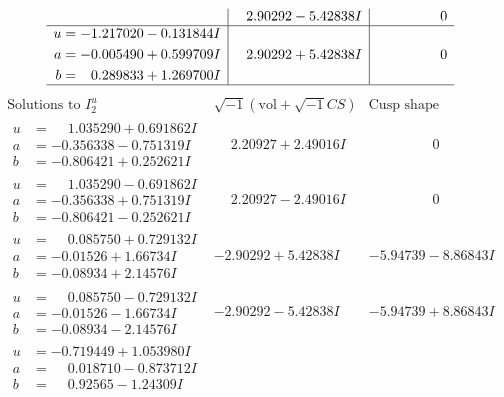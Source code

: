 \documentclass[1p]{elsarticle_modified}
\theoremstyle{definition}
\newcommand{\I}{\sqrt{-1}}
\begin{document}
$$\begin{array}{c|c|c}
 & \phantom{-}2.90292 - 5.42838 I & \phantom{-0.000000 } 0 \\ \hline\begin{aligned}
u &= -1.217020 - 0.131844 I \\
a &= -0.005490 + 0.599709 I \\
b &= \phantom{-}0.289833 + 1.269700 I\end{aligned}
 & \phantom{-}2.90292 + 5.42838 I & \phantom{-0.000000 } 0\\
 \hline 
 \end{array}$$\newpage$$\begin{array}{c|c|c}  
\text{Solutions to }I^u_{2}& \I (\text{vol} + \sqrt{-1}CS) & \text{Cusp shape}\\
 \hline 
\begin{aligned}
u &= \phantom{-}1.035290 + 0.691862 I \\
a &= -0.356338 - 0.751319 I \\
b &= -0.806421 + 0.252621 I\end{aligned}
 & \phantom{-}2.20927 + 2.49016 I & \phantom{-0.000000 } 0 \\ \hline\begin{aligned}
u &= \phantom{-}1.035290 - 0.691862 I \\
a &= -0.356338 + 0.751319 I \\
b &= -0.806421 - 0.252621 I\end{aligned}
 & \phantom{-}2.20927 - 2.49016 I & \phantom{-0.000000 } 0 \\ \hline\begin{aligned}
u &= \phantom{-}0.085750 + 0.729132 I \\
a &= -0.01526 + 1.66734 I \\
b &= -0.08934 + 2.14576 I\end{aligned}
 & -2.90292 + 5.42838 I & -5.94739 - 8.86843 I \\ \hline\begin{aligned}
u &= \phantom{-}0.085750 - 0.729132 I \\
a &= -0.01526 - 1.66734 I \\
b &= -0.08934 - 2.14576 I\end{aligned}
 & -2.90292 - 5.42838 I & -5.94739 + 8.86843 I \\ \hline\begin{aligned}
u &= -0.719449 + 1.053980 I \\
a &= \phantom{-}0.018710 - 0.873712 I \\
b &= \phantom{-}0.92565 - 1.24309 I\end{aligned}

\end{array}$$
\end{document}
